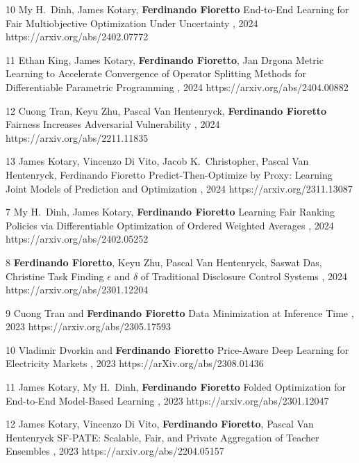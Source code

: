 \documentclass[localFont,alternative]{documentMETADATA}
\begin{document}
\begin{pubs}
\confentryShort
	{10}
	{My H.~Dinh, James Kotary, {\bf Ferdinando Fioretto}}
	{End-to-End Learning for Fair Multiobjective Optimization Under Uncertainty}
	{\procUAI, 2024}
	{https://arxiv.org/abs/2402.07772}

\confentryShort
	{11}
	{Ethan King, {James Kotary}, {\bf Ferdinando Fioretto}, Jan Drgona}
	{Metric Learning to Accelerate Convergence of Operator Splitting Methods for Differentiable Parametric Programming}
	{, 2024}
	{https://arxiv.org/abs/2404.00882}

\confentryShort
	{12}%
	{Cuong Tran, Keyu Zhu, Pascal Van Hentenryck, {\bf Ferdinando Fioretto}}
	{Fairness Increases Adversarial Vulnerability}
	{\procIJCAI, 2024}
	{https://arxiv.org/abs/2211.11835}

\confentryShort
	{13}
	{{James Kotary}, {Vincenzo Di Vito}, {Jacob K.~Christopher}, Pascal Van Hentenryck, Ferdinando Fioretto}
	{Predict-Then-Optimize by Proxy: Learning Joint Models of Prediction and Optimization}
  {\procECAI, 2024}
  {https://arxiv.org/2311.13087}

\confentryShort
	{7}
	{My H.~Dinh, James Kotary, {\bf Ferdinando Fioretto}}
	{Learning Fair Ranking Policies via Differentiable Optimization of Ordered Weighted Averages}
	{\procFAccT, 2024}
	{https://arxiv.org/abs/2402.05252}

\confentryShort
	{8}
	{{\bf Ferdinando Fioretto}, Keyu Zhu, Pascal Van Hentenryck, Saswat Das, Christine Task}
	{Finding $\epsilon$ and $\delta$ of Traditional Disclosure Control Systems}
	{\procAAAI, 2024}
	{https://arxiv.org/abs/2301.12204}

\confentryShort
	{9}
	{{Cuong Tran} and {\bf Ferdinando Fioretto}}
	{Data Minimization at Inference Time}
	{\procNeurIPS, 2023}
	{https://arxiv.org/abs/2305.17593}

\confentryShort
	{10}
 	{Vladimir Dvorkin and {\bf Ferdinando Fioretto}}
	{Price-Aware Deep Learning for Electricity Markets}
	{, 2023}
	{https://arXiv.org/abs/2308.01436}

\confentryShort 
	{11} %
	{{James Kotary}, {My H.~Dinh}, {\bf Ferdinando Fioretto}}
	{Folded Optimization for End-to-End Model-Based Learning}
	{\procIJCAI, 2023}
	{https://arxiv.org/abs/2301.12047}

\confentryShort
 {12} %
	{{James Kotary}, {Vincenzo Di Vito}, {\bf Ferdinando Fioretto}, Pascal Van Hentenryck}
	{SF-PATE: Scalable, Fair, and Private Aggregation of Teacher Ensembles}
  {\procIJCAI, 2023}
	{https://arxiv.org/abs/2204.05157}


\end{pubs}
\end{document}
